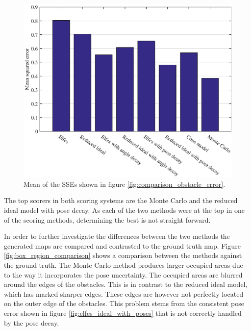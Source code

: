 \begin{figure}[htbp]
	\centering
	\includegraphics[scale=1]{figures/static_mapping/static_mapping_mse}
	\caption{Mean of the SSEs shown in figure \ref{fig:comparison_obstacle_error}.}
	\label{fig:comparison_obstacle_error_per_cell}
\end{figure}

The top scorers in both scoring systems are the Monte Carlo and the reduced ideal model with pose decay. As each of the two methods were at the top in one of the scoring methods, determining the best is not straight forward.

In order to further investigate the differences between the two methods the generated maps are compared and contrasted to the ground truth map. 
Figure \vref{fig:box_region_comparison} shows a comparison between the methods against the ground truth.
The Monte Carlo method produces larger occupied areas due to the way it incorporates the pose uncertainty. The occupied areas are blurred around the edges of the obstacles. 
This is in contrast to the reduced ideal model, which has marked sharper edges. 
These edges are however not perfectly located on the outer edge of the obstacles. 
This problem stems from the consistent pose error shown in figure \ref{fig:elfes_ideal_with_poses} that is not correctly handled by the pose decay. 

